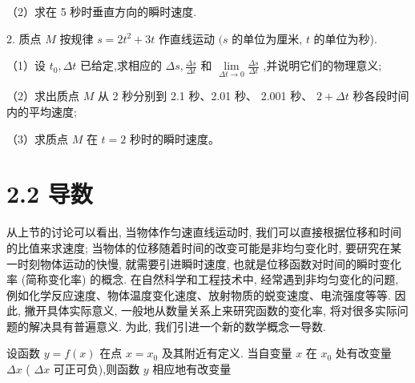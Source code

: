 \documentclass[10pt]{article}
\begin{document}
\begin{center}
\end{center}

（2）求在 5 秒时垂直方向的瞬时速度.

2. 质点 \(M\) 按规律 \(s = 2{t}^{2} + {3t}\) 作直线运动 \((s\) 的单位为厘米, \(t\) 的单位为秒).

（1）设 \({t}_{0},{\Delta t}\) 已给定,求相应的 \({\Delta s},\frac{\Delta s}{\Delta t}\) 和 \(\mathop{\lim }\limits_{{{\Delta t} \rightarrow 0}}\frac{\Delta s}{\Delta t}\) ,并说明它们的物理意义;

（2）求出质点 \(M\) 从 2 秒分别到 2.1 秒、2.01 秒、 2.001 秒、 \(2 + {\Delta t}\) 秒各段时间内的平均速度;

（3）求质点 \(M\) 在 \(t = 2\) 秒时的瞬时速度。

\section*{2.2 导数}

从上节的讨论可以看出, 当物体作匀速直线运动时, 我们可以直接根据位移和时间的比值来求速度; 当物体的位移随着时间的改变可能是非均匀变化时, 要研究在某一时刻物体运动的快慢, 就需要引进瞬时速度, 也就是位移函数对时间的瞬时变化率 (简称变化率) 的概念. 在自然科学和工程技术中, 经常遇到非均匀变化的问题, 例如化学反应速度、物体温度变化速度、放射物质的蜕变速度、电流强度等等. 因此, 撇开具体实际意义, 一般地从数量关系上来研究函数的变化率, 将对很多实际问题的解决具有普遍意义. 为此, 我们引进一个新的数学概念一导数.

设函数 \(y = f\left( x\right)\) 在点 \(x = {x}_{0}\) 及其附近有定义. 当自变量 \(x\) 在 \({x}_{0}\) 处有改变量 \({\Delta x}\) ( \({\Delta x}\) 可正可负),则函数 \(y\) 相应地有改变量
\end{document}
